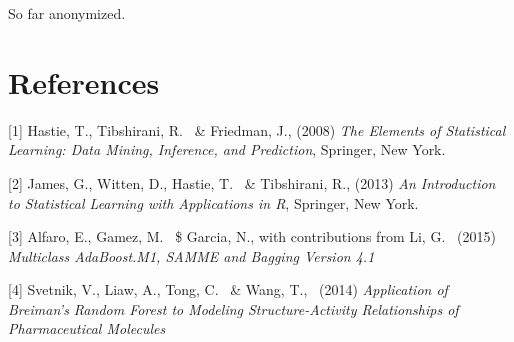 \documentclass{article}
\begin{document}
So far anonymized.


\section*{References}

\small

[1] Hastie, T., Tibshirani, R. \ \& Friedman, J., (2008) {\it The Elements of Statistical Learning: Data Mining, Inference, and Prediction}, Springer, New York.

[2] James, G., Witten, D., Hastie, T. \ \& Tibshirani, R., (2013) {\it An Introduction to Statistical Learning
with Applications in R}, Springer, New York.

[3] Alfaro, E., Gamez, M. \ \$ Garcia, N., with contributions from Li, G. \ (2015) {\it Multiclass AdaBoost.M1, SAMME and Bagging Version 4.1}

[4] Svetnik, V., Liaw, A., Tong, C. \ \& Wang, T., \ (2014) {\it Application of Breiman’s Random Forest to Modeling  Structure-Activity  Relationships  of  Pharmaceutical  Molecules}
\end{document}

